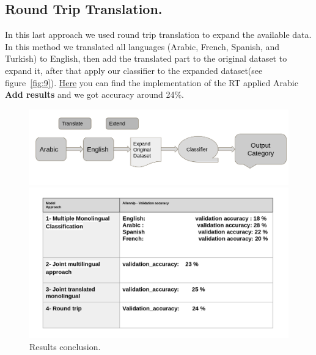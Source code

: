 \documentclass[letterpaper,12pt]{article}
\begin{document}
\subsection{Round Trip Translation.}
In this last approach we used round trip translation to expand the available data. In this method we translated all languages (Arabic, French, Spanish, and Turkish) to English, then add the translated part to the original dataset to expand it, after that apply our classifier to the expanded dataset(see figure~\ref{fig:9}). \href{https://github.com/Mkamel104/MLTC/blob/master/AllenNlp/AllenNlp_PHASEI_PHASEII_PHASEIII.ipynb}{Here} you can find the implementation of the RT applied Arabic \textbf{Add results} and we got accuracy around 24\%.




\begin{figure}
	\centering
	\begin{minipage}[b]{.4\textwidth}
		\centering \includegraphics[width=0.8\columnwidth]{5.png}
		
		\caption{
			\label{fig:9} %
			Round Trip Approach
		}
		
	\end{minipage}\qquad
	\begin{minipage}[b]{.4\textwidth}
		
		\centering \includegraphics[width=0.8\columnwidth]{out.png}
		
		\caption{
			\label{fig:10} %
			Results conclusion.
		}
		
	\end{minipage}
\end{figure}
\end{document}
